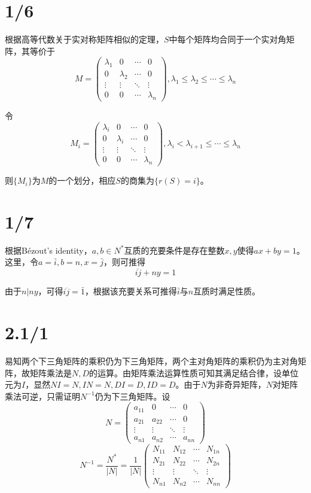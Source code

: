 \documentclass{article}
\begin{document}
\section{1/6}
根据高等代数关于实对称矩阵相似的定理，$S$中每个矩阵均合同于一个实对角矩阵，其等价于
$$
M=\begin{pmatrix}
\lambda_1 & 0 & \cdots & 0 \\
0 & \lambda_2 & \cdots & 0 \\
\vdots & \vdots & \ddots & \vdots \\
0 & 0 & \cdots & \lambda_n
\end{pmatrix},\lambda_1\leqslant\lambda_2\leqslant\cdots\leqslant\lambda_n
$$

令
$$
M_i=\begin{pmatrix}
\lambda_i & 0 & \cdots & 0 \\
0 & \lambda_i & \cdots & 0 \\
\vdots & \vdots & \ddots & \vdots \\
0 & 0 & \cdots & \lambda_n
\end{pmatrix},\lambda_i<\lambda_{i+1}\leqslant\cdots\leqslant\lambda_n
$$

则$\{M_i\}$为$M$的一个划分，相应$S$的商集为$\{r(S)=i\}$。

\section{1/7}
根据Bézout's identity，$a,b\in N^*$互质的充要条件是存在整数$x,y$使得$ax+by=1$。这里，令$a=\bar{i},b=n,x=\bar{j}$，则可推得
$$\overline{ij}+ny=1$$

由于$n|ny$，可得$\overline{ij}=\bar{1}$，根据该充要关系可推得$\bar{i}$与$n$互质时满足性质。

\section{2.1/1}
易知两个下三角矩阵的乘积仍为下三角矩阵，两个主对角矩阵的乘积仍为主对角矩阵，故矩阵乘法是$N,D$的运算。由矩阵乘法运算性质可知其满足结合律，设单位元为$I$，显然$NI=N,IN=N,DI=D,ID=D$。由于$N$为非奇异矩阵，$N$对矩阵乘法可逆，只需证明$N^{-1}$仍为下三角矩阵。设
$$
N=\begin{pmatrix}
a_{11} & 0 & \cdots & 0 \\
a_{21} & a_{22} & \cdots & 0 \\
\vdots & \vdots & \ddots & \vdots \\
a_{n1} & a_{n2} & \cdots & a_{nn}
\end{pmatrix}
$$
$$
N^{-1}=\frac{N^*}{|N|}=\frac{1}{|N|}\begin{pmatrix}
N_{11} & N_{12} & \cdots & N_{1n} \\
N_{21} & N_{22} & \cdots & N_{2n} \\
\vdots & \vdots & \ddots & \vdots \\
N_{n1} & N_{n2} & \cdots & N_{nn}
\end{pmatrix}
$$
\end{document}
